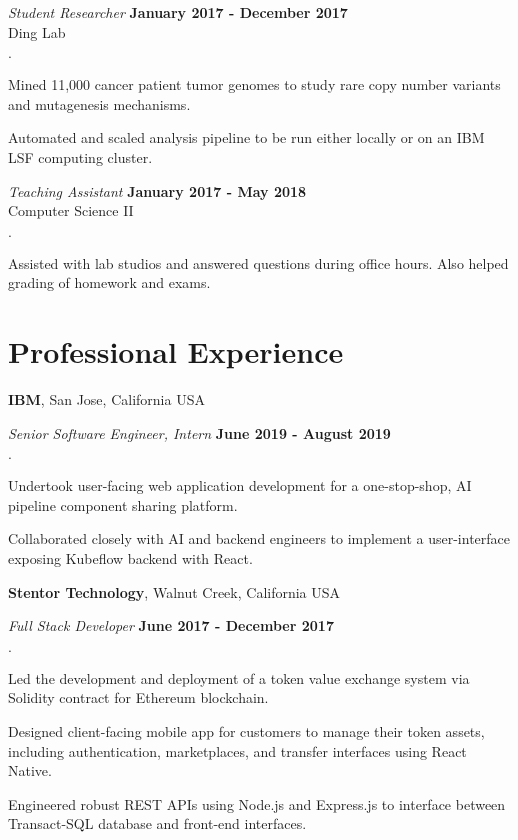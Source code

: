 \documentclass[line,margin]{res}
\newenvironment{list2}{
  \begin{list}{\boldmath$\cdot$}{%
      \setlength{\itemsep}{0in}
      \setlength{\parsep}{0in} \setlength{\parskip}{0in}
      \setlength{\topsep}{0in} \setlength{\partopsep}{0in}
      \setlength{\leftmargin}{0.2in}}}{\end{list}}
\begin{document}
\begin{resume}
{\em Student Researcher} \hfill {\bf January 2017 - December 2017}\\
Ding Lab \\
\vspace*{-.1in}
\begin{list2}
\item Mined 11,000 cancer patient tumor genomes to study rare copy number
variants and mutagenesis mechanisms.
\item Automated and scaled analysis pipeline to be run either locally or on
an IBM LSF computing cluster.
\end{list2}

{\em Teaching Assistant} \hfill {\bf January 2017 - May 2018}\\
Computer Science II \\
\vspace*{-.1in}
\begin{list2}
\item Assisted with lab studios and answered questions during office hours. Also helped grading of homework and exams.
\end{list2}

\newpage 
\section{\sc Professional Experience}
{\bf IBM}, San Jose, California USA

\vspace{-0.3cm}
{\em Senior Software Engineer, Intern} \hfill {\bf June 2019 - August 2019}\\
\vspace*{-.1in}
\begin{list2}
\item Undertook user-facing web application development for a
one-stop-shop, AI pipeline component sharing platform.
\item Collaborated closely with AI and backend engineers to implement a
user-interface exposing Kubeflow backend with React.
\end{list2}

{\bf Stentor Technology}, Walnut Creek, California USA

\vspace{-0.3cm}
{\em Full Stack Developer} \hfill {\bf June 2017 - December 2017}\\
\vspace*{-.1in}
\begin{list2}
\item Led the development and deployment of a token value exchange system
via Solidity contract for Ethereum blockchain.
\item Designed client-facing mobile app for customers to manage their token
assets, including authentication, marketplaces, and transfer interfaces using
React Native.
\item Engineered robust REST APIs using Node.js and Express.js to interface
between Transact-SQL database and front-end interfaces.
\end{list2}



\end{resume}
\end{document}
